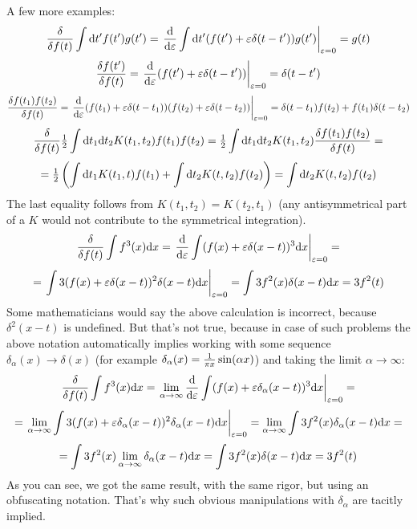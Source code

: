 A few more examples: 
\begin{equation*}
  {\delta\over\delta f(t)}\int{\rm d} t'f(t')g(t')= \left.{{\rm d}\over{\rm d}\varepsilon}\int{\rm d} t'(f(t')+\varepsilon\delta(t-t'))g(t') \right|_{\varepsilon=0}=g(t)
\end{equation*}
\begin{equation*}
  {\delta f(t')\over\delta f(t)}= \left.{{\rm d}\over{\rm d}\varepsilon}(f(t')+\varepsilon\delta(t-t')) \right|_{\varepsilon=0}=\delta(t-t')
\end{equation*}
\begin{equation*}
  {\delta f(t_1)f(t_2)\over\delta f(t)}= \left.{{\rm d}\over{\rm d}\varepsilon}(f(t_1)+\varepsilon\delta(t-t_1)) (f(t_2)+\varepsilon\delta(t-t_2)) \right|_{\varepsilon=0}=\delta(t-t_1)f(t_2)+f(t_1)\delta(t-t_2)
\end{equation*}
\begin{equation*}
  {\delta\over\delta f(t)}{\textstyle{1\over2}}\int{\rm d} t_1{\rm d} t_2K(t_1,t_2)f(t_1)f(t_2)= {\textstyle{1\over2}}\int{\rm d} t_1{\rm d} t_2K(t_1,t_2){\delta f(t_1)f(t_2)\over\delta f(t)}=
\end{equation*}
\begin{equation*}
  ={\textstyle{1\over2}}\left(\int{\rm d} t_1 K(t_1,t)f(t_1)+\int{\rm d} t_2 K(t,t_2)f(t_2)\right) =\int{\rm d} t_2 K(t,t_2)f(t_2)
\end{equation*}
The last equality follows from $K(t_1,t_2)=K(t_2,t_1)$ (any antisymmetrical part of a $K$ would not contribute to the symmetrical integration). 
\begin{equation*}
  {\delta\over\delta f(t)}\int f^3(x){\rm d} x= \left.{{\rm d}\over{\rm d}\varepsilon}\int(f(x)+\varepsilon\delta(x-t))^3{\rm d} x \right|_{\varepsilon=0}=
\end{equation*}
\begin{equation*}
  =\left.\int3(f(x)+\varepsilon\delta(x-t))^2\delta(x-t){\rm d} x \right|_{\varepsilon=0}=\int3f^2(x)\delta(x-t){\rm d} x=3f^2(t)
\end{equation*}
Some mathematicians would say the above calculation is incorrect, because $\delta^2(x-t)$ is undefined. But that's not true, because in case of such problems the above notation automatically implies working with some sequence $\delta_\alpha(x) \to \delta(x)$ (for example $\delta_\alpha(x) = {1\over\pi x}\sin(\alpha x)$) and taking the limit $\alpha\to\infty$: 
\begin{equation*}
  {\delta\over\delta f(t)}\int f^3(x){\rm d} x= \left.\lim_{\alpha\to\infty}{{\rm d}\over{\rm d}\varepsilon}\int(f(x)+\varepsilon\delta_\alpha(x-t))^3{\rm d} x \right|_{\varepsilon=0}=
\end{equation*}
\begin{equation*}
  =\left.\lim_{\alpha\to\infty}\int3(f(x)+\varepsilon\delta_\alpha(x-t))^2\delta_\alpha(x-t){\rm d} x \right|_{\varepsilon=0}=\lim_{\alpha\to\infty}\int3f^2(x)\delta_\alpha(x-t){\rm d} x=
\end{equation*}
\begin{equation}
  =\int3f^2(x)\lim_{\alpha\to\infty}\delta_\alpha(x-t){\rm d} x= \int3f^2(x)\delta(x-t){\rm d} x=3f^2(t)  \label{functionalderdel}
\end{equation}
As you can see, we got the same result, with the same rigor, but using an obfuscating notation. That's why such obvious manipulations with $\delta_\alpha$ are tacitly implied.

